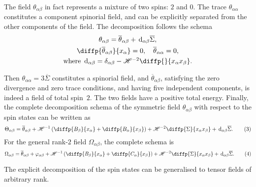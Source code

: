 \documentclass{article}
\newcommand{\HH}{\mathscr{H}}
\renewcommand{\d}{\,\mathrm{d}}
\newcommand{\oldpage}[1]{\marginpar{\footnotesize$\Big\vert$ \textit{p.~#1}}}
\begin{document}
\medskip\hrulefill\bigskip

The field $\theta_{\alpha\beta}$ in fact represents a mixture of two spins: $2$ and $0$.
The trace $\theta_{\alpha\alpha}$ constitutes a component spinorial field, and can be explicitly separated from the other components of the field.
The decomposition follows the schema
\begin{gather*}
  \theta_{\alpha\beta} = \overline{\theta}_{\alpha\beta} + \d_{\alpha\beta}\overline{\Sigma},
\\\diffp{{\overline{\theta}_{\alpha\beta}}}{{x_\alpha}} = 0,
  \quad \overline{\theta}_{\alpha\alpha} = 0,
\\\mbox{where $\d_{\alpha\beta}=\delta_{\alpha\beta}-\HH^{-2}\diffp{}{{x_\alpha}{x_\beta}}$.}
\end{gather*}

Then $\theta_{\alpha\alpha}=3\overline{\Sigma}$ constitutes a spinorial field, and $\overline{\theta}_{\alpha\beta}$, satisfying the zero divergence and zero trace conditions, and having five independent components, is indeed a field of total spin~$2$.
The two fields have a positive total energy.
Finally, the complete decomposition schema of the symmetric field $\theta_{\alpha\beta}$ with respect to the spin states can be written as
\oldpage{13-05}
\[
\label{equation3}
  \Theta_{\alpha\beta} = \overline{\theta}_{\alpha\beta} + \HH^{-1}\left(
    \diffp{{B_\beta}}{{x_\alpha}} + \diffp{{B_\alpha}}{{x_\beta}}
  \right) + \HH^{-2} \diffp{\Sigma}{{x_\alpha}{x_\beta}} + \d_{\alpha\beta}\overline{\Sigma}.
  \tag{3}
\]
For the general rank-$2$ field $\Omega_{\alpha\beta}$, the complete schema is
\[
\label{equation4}
  \Omega_{\alpha\beta} = \overline{\theta}_{\alpha\beta} + \varphi_{\alpha\beta} + \HH^{-1}\left(
    \diffp{{B_\beta}}{{x_\alpha}} + \diffp{{C_\alpha}}{{x_\beta}}
  \right) + \HH^{-2} \diffp{\Sigma}{{x_\alpha}{x_\beta}} + \d_{\alpha\beta}\overline{\Sigma}.
  \tag{4}
\]

The explicit decomposition of the spin states can be generalised to tensor fields of arbitrary rank.

\medskip\hrulefill\bigskip
\end{document}
